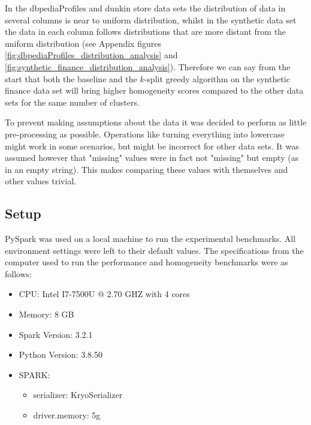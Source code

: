 In the dbpediaProfiles and dunkin store data sets the distribution of data in several columns is near to uniform distribution, whilst in the synthetic data set the data in each column follows distributions that are more distant from the uniform distribution (see Appendix figures \ref{fig:dbpediaProfiles_distribution_analysis} and \ref{fig:synthetic_finance_distribution_analysis}). Therefore we can say from the start that both the baseline and the $k$-split greedy algorithm on the synthetic finance data set will bring higher homogeneity scores compared to the other data sets for the same number of clusters.

To prevent making assumptions about the data it was decided to perform as little pre-processing as possible. Operations like turning everything into lowercase might work in some scenarios, but might be incorrect for other data sets. It was assumed however that "missing" values were in fact not "missing" but empty (as in an empty string). This makes comparing these values with themselves and other values trivial.

\subsection{Setup}
PySpark was used on a local machine to run the experimental benchmarks. All environment settings were left to their default values.
The specifications from the computer used to run the performance and  homogeneity benchmarks were as follows:
\begin{itemize}
    \item CPU: Intel I7-7500U @ 2.70 GHZ with 4 cores
    \item Memory: 8 GB
    \item Spark Version: 3.2.1
    \item Python Version: 3.8.50
    \item SPARK:
    \begin{itemize}
        \item serializer: KryoSerializer
        \item driver.memory: 5g
    \end{itemize}
\end{itemize}


